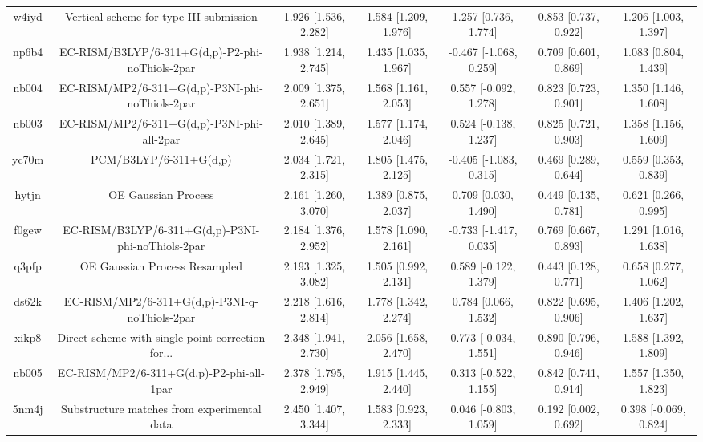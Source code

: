 \documentclass{article}
\begin{document}
\begin{center}
\begin{longtable}{|ccccccc|}
 w4iyd &            Vertical scheme for type III submission &  1.926 [1.536, 2.282] &  1.584 [1.209, 1.976] &     1.257 [0.736, 1.774] &  0.853 [0.737, 0.922] &   1.206 [1.003, 1.397] \\
 np6b4 &    EC-RISM/B3LYP/6-311+G(d,p)-P2-phi-noThiols-2par &  1.938 [1.214, 2.745] &  1.435 [1.035, 1.967] &   -0.467 [-1.068, 0.259] &  0.709 [0.601, 0.869] &   1.083 [0.804, 1.439] \\
 nb004 &    EC-RISM/MP2/6-311+G(d,p)-P3NI-phi-noThiols-2par &  2.009 [1.375, 2.651] &  1.568 [1.161, 2.053] &    0.557 [-0.092, 1.278] &  0.823 [0.723, 0.901] &   1.350 [1.146, 1.608] \\
 nb003 &         EC-RISM/MP2/6-311+G(d,p)-P3NI-phi-all-2par &  2.010 [1.389, 2.645] &  1.577 [1.174, 2.046] &    0.524 [-0.138, 1.237] &  0.825 [0.721, 0.903] &   1.358 [1.156, 1.609] \\
 yc70m &                             PCM/B3LYP/6-311+G(d,p) &  2.034 [1.721, 2.315] &  1.805 [1.475, 2.125] &   -0.405 [-1.083, 0.315] &  0.469 [0.289, 0.644] &   0.559 [0.353, 0.839] \\
 hytjn &                                OE Gaussian Process &  2.161 [1.260, 3.070] &  1.389 [0.875, 2.037] &     0.709 [0.030, 1.490] &  0.449 [0.135, 0.781] &   0.621 [0.266, 0.995] \\
 f0gew &  EC-RISM/B3LYP/6-311+G(d,p)-P3NI-phi-noThiols-2par &  2.184 [1.376, 2.952] &  1.578 [1.090, 2.161] &   -0.733 [-1.417, 0.035] &  0.769 [0.667, 0.893] &   1.291 [1.016, 1.638] \\
 q3pfp &                      OE Gaussian Process Resampled &  2.193 [1.325, 3.082] &  1.505 [0.992, 2.131] &    0.589 [-0.122, 1.379] &  0.443 [0.128, 0.771] &   0.658 [0.277, 1.062] \\
 ds62k &      EC-RISM/MP2/6-311+G(d,p)-P3NI-q-noThiols-2par &  2.218 [1.616, 2.814] &  1.778 [1.342, 2.274] &     0.784 [0.066, 1.532] &  0.822 [0.695, 0.906] &   1.406 [1.202, 1.637] \\
 xikp8 &  Direct scheme with single point correction for... &  2.348 [1.941, 2.730] &  2.056 [1.658, 2.470] &    0.773 [-0.034, 1.551] &  0.890 [0.796, 0.946] &   1.588 [1.392, 1.809] \\
 nb005 &           EC-RISM/MP2/6-311+G(d,p)-P2-phi-all-1par &  2.378 [1.795, 2.949] &  1.915 [1.445, 2.440] &    0.313 [-0.522, 1.155] &  0.842 [0.741, 0.914] &   1.557 [1.350, 1.823] \\
 5nm4j &        Substructure matches from experimental data &  2.450 [1.407, 3.344] &  1.583 [0.923, 2.333] &    0.046 [-0.803, 1.059] &  0.192 [0.002, 0.692] &  0.398 [-0.069, 0.824] \\

\end{longtable}
\end{center}
\end{document}
